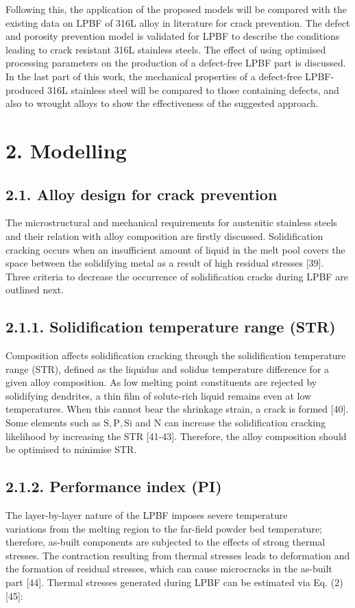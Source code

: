 \documentclass[10pt]{article}
\begin{document}
Following this, the application of the proposed models will be compared with the existing data on LPBF of 316L alloy in literature for crack prevention. The defect and porosity prevention model is validated for LPBF to describe the conditions leading to crack resistant 316L stainless steels. The effect of using optimised processing parameters on the production of a defect-free LPBF part is discussed. In the last part of this work, the mechanical properties of a defect-free LPBF-produced 316L stainless steel will be compared to those containing defects, and also to wrought alloys to show the effectiveness of the suggested approach.

\section*{2. Modelling}
\subsection*{2.1. Alloy design for crack prevention}
The microstructural and mechanical requirements for austenitic stainless steels and their relation with alloy composition are firstly discussed. Solidification cracking occurs when an insufficient amount of liquid in the melt pool covers the space between the solidifying metal as a result of high residual stresses [39]. Three criteria to decrease the occurrence of solidification cracks during LPBF are outlined next.

\subsection*{2.1.1. Solidification temperature range (STR)}
Composition affects solidification cracking through the solidification temperature range (STR), defined as the liquidus and solidus temperature difference for a given alloy composition. As low melting point constituents are rejected by solidifying dendrites, a thin film of solute-rich liquid remains even at low temperatures. When this cannot bear the shrinkage strain, a crack is formed [40]. Some elements such as $\mathrm{S}, \mathrm{P}, \mathrm{Si}$ and $\mathrm{N}$ can increase the solidification cracking likelihood by increasing the STR [41-43]. Therefore, the alloy composition should be optimised to minimise STR.

\subsection*{2.1.2. Performance index (PI)}
The layer-by-layer nature of the LPBF imposes severe temperature\\
variations from the melting region to the far-field powder bed temperature; therefore, as-built components are subjected to the effects of strong thermal stresses. The contraction resulting from thermal stresses leads to deformation and the formation of residual stresses, which can cause microcracks in the as-built part [44]. Thermal stresses generated during LPBF can be estimated via Eq. (2) [45]:
\end{document}
